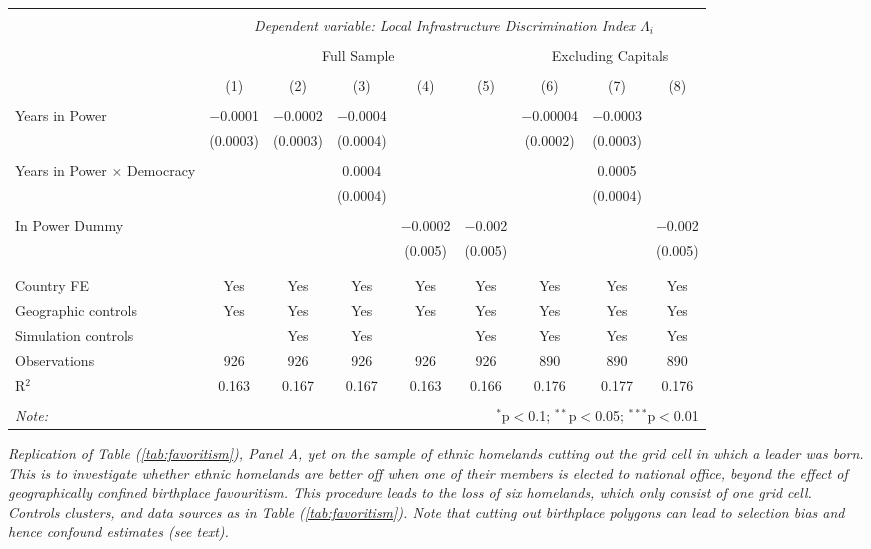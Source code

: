 \documentclass[11pt, oneside]{article}   	%
\let\oldref\ref
\renewcommand{\ref}[1]{(\oldref{#1})}
\newcommand{\mysubcaption}[1]{
\justify
\begin{spacing}{0.7}
\textit{\footnotesize #1}
\end{spacing}}
\begin{document}
\begin{spacing}{1.3}
\begin{table}[h]
{    \begin{tabular}{@{\extracolsep{5pt}}lcccccccc}
    \\[-1.8ex]\hline
    \hline \\[-1.8ex]
     & \multicolumn{8}{c}{\textit{Dependent variable: Local Infrastructure Discrimination Index $\Lambda_{i}$}} \\
    \cline{2-9} \\[-1.8ex]
  & \multicolumn{5}{c}{Full Sample} & \multicolumn{3}{c}{Excluding Capitals} \\
    \cline{2-6}   \cline{7-9}
    \\[-1.8ex] & (1) & (2) & (3) & (4) & (5) & (6) & (7) & (8)\\
    \hline \\[-1.8ex]
    Years in Power & $-$0.0001 & $-$0.0002 & $-$0.0004 &  &  & $-$0.00004 & $-$0.0003 &  \\
     & (0.0003) & (0.0003) & (0.0004) &  &  & (0.0002) & (0.0003) &  \\
     & & & & & & & & \\
    Years in Power $\times$ Democracy &  &  & 0.0004 &  &  &  & 0.0005 &  \\
     &  &  & (0.0004) &  &  &  & (0.0004) &  \\
     & & & & & & & & \\
    In Power Dummy &  &  &  & $-$0.0002 & $-$0.002 &  &  & $-$0.002 \\
     &  &  &  & (0.005) & (0.005) &  &  & (0.005) \\
     & & & & & & & & \\
   \hline \\[-1.8ex]
   Country FE & Yes & Yes & Yes & Yes & Yes & Yes & Yes & Yes \\
   Geographic controls & Yes & Yes & Yes & Yes & Yes & Yes & Yes & Yes \\
   Simulation controls &  & Yes & Yes &  & Yes & Yes & Yes & Yes \\
   Observations & 926 & 926 & 926 & 926 & 926 & 890 & 890 & 890 \\
   R$^{2}$ & 0.163 & 0.167 & 0.167 & 0.163 & 0.166 & 0.176 & 0.177 & 0.176 \\
   \hline
   \hline \\[-1.8ex]
   \textit{Note:}  & \multicolumn{8}{r}{$^{*}$p$<$0.1; $^{**}$p$<$0.05; $^{***}$p$<$0.01} \\
   \end{tabular}

  }

  \mysubcaption{Replication of Table \ref{tab:favoritism}, Panel A, yet on the sample of ethnic homelands cutting out the grid cell in which a leader was born. This is to investigate whether ethnic homelands are better off when one of their members is elected to national office, beyond the effect of geographically confined birthplace favouritism. This procedure leads to the loss of six homelands, which only consist of one grid cell. Controls clusters, and data sources as in Table \ref{tab:favoritism}. Note that cutting out birthplace polygons can lead to selection bias and hence confound estimates (see text).}
  \end{table}


\end{spacing}
\end{document}
